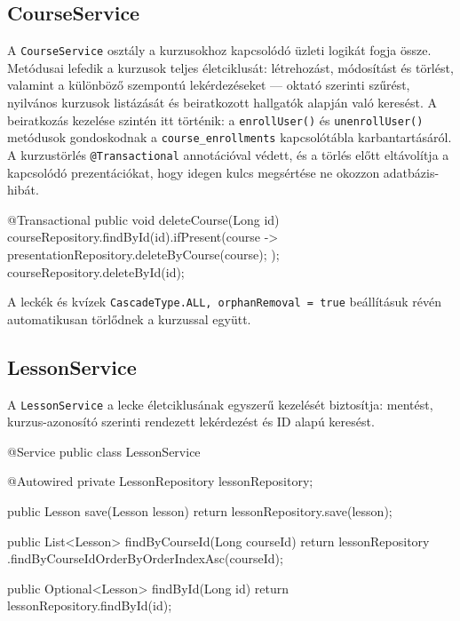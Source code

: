 \subsection{CourseService}

A \texttt{CourseService} osztály a kurzusokhoz kapcsolódó üzleti logikát fogja össze. Metódusai lefedik a kurzusok teljes életciklusát: létrehozást, módosítást és törlést, valamint a különböző szempontú lekérdezéseket — oktató szerinti szűrést, nyilvános kurzusok listázását és beiratkozott hallgatók alapján való keresést. A beiratkozás kezelése szintén itt történik: a \texttt{enrollUser()} és \texttt{unenrollUser()} metódusok gondoskodnak a \texttt{course\_enrollments} kapcsolótábla karbantartásáról. A kurzustörlés \texttt{@Transactional} annotációval védett, és a törlés előtt eltávolítja a kapcsolódó prezentációkat, hogy idegen kulcs megsértése ne okozzon adatbázis-hibát.

\begin{java}[caption={Kurzustörlés — Presentation előzetes törlésével},label=java:deletecourse]
@Transactional
public void deleteCourse(Long id) {
    courseRepository.findById(id).ifPresent(course -> {
        presentationRepository.deleteByCourse(course);
    });
    courseRepository.deleteById(id);
}
\end{java}

A leckék és kvízek \texttt{CascadeType.ALL, orphanRemoval = true} beállításuk révén automatikusan törlődnek a kurzussal együtt.

\subsection{LessonService}

A \texttt{LessonService} a lecke életciklusának egyszerű kezelését biztosítja: mentést, kurzus-azonosító szerinti rendezett lekérdezést és ID alapú keresést.

\begin{java}[caption={A LessonService metódusai},label=java:lessonservice]
@Service
public class LessonService {

    @Autowired
    private LessonRepository lessonRepository;

    public Lesson save(Lesson lesson) {
        return lessonRepository.save(lesson);
    }

    public List<Lesson> findByCourseId(Long courseId) {
        return lessonRepository
                .findByCourseIdOrderByOrderIndexAsc(courseId);
    }

    public Optional<Lesson> findById(Long id) {
        return lessonRepository.findById(id);
    }
}
\end{java}

